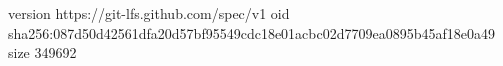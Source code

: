 version https://git-lfs.github.com/spec/v1
oid sha256:087d50d42561dfa20d57bf95549cdc18e01acbc02d7709ea0895b45af18e0a49
size 349692
